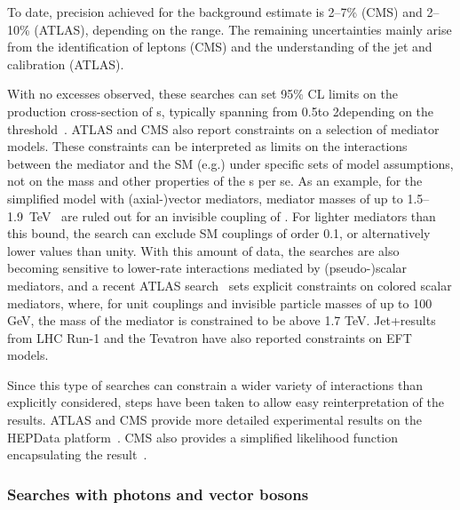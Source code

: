 To date, precision achieved for the background estimate is 2--7\% (CMS) and 2--10\% (ATLAS), depending on the \MET range.
The remaining uncertainties mainly arise from the identification of leptons (CMS) and the understanding of the jet and \MET calibration (ATLAS). 


With no excesses observed, these searches can set 95\% CL limits on the production cross-section of {\IP}s, typically spanning from 0.5\pb to 2\fb depending on the \MET threshold~\cite{Aaboud:2017phn}.
ATLAS and CMS also report constraints on a selection of mediator models.
These constraints can be interpreted as limits on the interactions between the mediator and the SM (e.g.\gq) under specific sets of model assumptions, not on the mass and other properties of the {\IP}s per se.
As an example, for the simplified model with (axial-)vector mediators, mediator masses of up to 1.5--1.9~TeV~\cite{Aaboud:2017phn,Sirunyan:2017jix} are ruled out for an invisible coupling of . For lighter mediators than this bound, the search can exclude SM couplings of order 0.1, or alternatively lower \gdm values than unity.
With this amount of data, the searches are also becoming sensitive to lower-rate interactions mediated by (pseudo-)scalar mediators, and a recent ATLAS search~\cite{Aaboud:2017phn} sets explicit constraints on colored scalar mediators, where, for unit couplings and invisible particle masses of up to 100 GeV, the mass of the mediator is constrained to be above 1.7 TeV. 
Jet+\MET results from LHC Run-1 and the Tevatron have also reported constraints on EFT models.  

Since this type of searches can constrain a wider variety of interactions than explicitly considered, steps have been taken to allow easy reinterpretation of the results. 
ATLAS and CMS provide more detailed experimental results on the HEPData platform~\cite{Maguire:2017ypu}.
CMS also provides a simplified likelihood function encapsulating the result~\cite{Collaboration:2242860,Sirunyan:2017jix}.


\subsubsection{Searches with photons and vector bosons}
\label{subsub:monoV}

